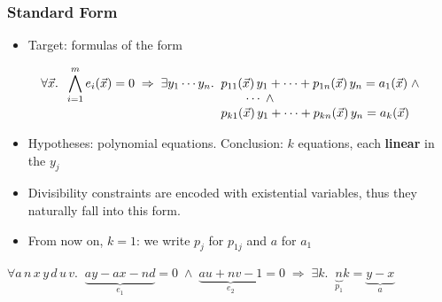 \documentclass[usepdftitle=false,aspectratio=169,usenames,dvipsnames]{beamer}
\newcommand\pvitem{\pause\vfill\item}
\begin{document}
\begin{frame}
  \frametitle{Standard Form}
  \begin{itemize}
    \item Target: formulas of the form
  \end{itemize}
  \[
    \forall \vec{x}.\;\; \bigwedge_{i=1}^{m} e_i(\vec{x}) = 0 \;\Rightarrow\; \exists y_1 \cdots y_n.\;\;
    \begin{array}[t]{@{}l@{}}
      p_{11}(\vec{x})\, y_1 + \cdots + p_{1n}(\vec{x})\, y_n = a_1(\vec{x}) \;\wedge \\
      \qquad \cdots \;\wedge \\
      p_{k1}(\vec{x})\, y_1 + \cdots + p_{kn}(\vec{x})\, y_n = a_k(\vec{x})
    \end{array}
  \]
  \begin{itemize}
    \item Hypotheses: polynomial equations. Conclusion: $k$ equations, each \textbf{linear} in the $y_j$
    \pvitem Divisibility constraints are encoded with existential variables, thus they naturally fall into this form.
    \pvitem From now on, $k = 1$: we write $p_j$ for $p_{1j}$ and $a$ for $a_1$
  \end{itemize}
  \pause
  \vfill
  \begin{tcolorbox}[colback=green!5,colframe=green!40!black,title=Example]
    \centering
    $\forall a\, n\, x\, y\, d\, u\, v.\;\; \underbrace{ay - ax - nd}_{e_1} = 0 \;\wedge\; \underbrace{au + nv - 1}_{e_2} = 0 \;\Rightarrow\; \exists k.\;\; \underbrace{n}_{p_1} k = \underbrace{y - x}_{a}$
  \end{tcolorbox}
\end{frame}
\end{document}
